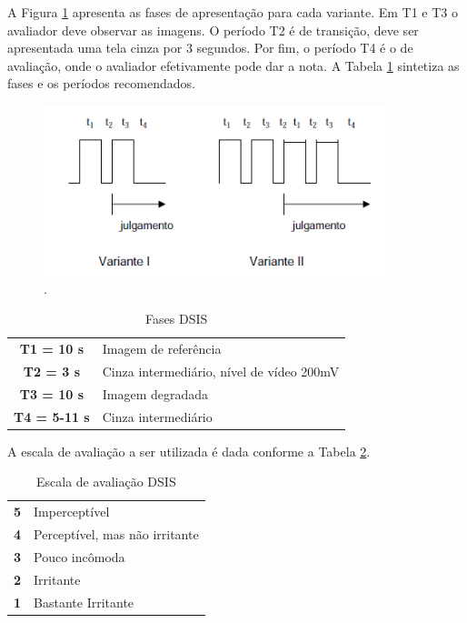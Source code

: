 A Figura \ref{fig:dsisvariantes} apresenta as fases de apresentação para cada variante. Em T1 e T3 o avaliador deve observar as imagens. O período T2 é de transição, deve ser apresentada uma tela cinza por 3 segundos. Por fim, o período T4 é o de avaliação, onde o avaliador efetivamente pode dar a nota. A Tabela \ref{tab:dsisfases} sintetiza as fases e os períodos recomendados.

\begin{figure}[!htb]
	\centering
	\includegraphics[width=0.9\textwidth]{./imgs/dsisvariantes.png}
	\caption{.}
	\label{fig:dsisvariantes}
\end{figure}

\begin{table}
	\centering
	\caption{Fases DSIS}
	\label{tab:dsisfases}
	\begin{tabular}{c|l}
		\hline
		\textbf{T1 = 10 s} & Imagem de referência \\
		\textbf{T2 = 3 s} & Cinza intermediário, nível de vídeo 200mV \\
		\textbf{T3 = 10 s} & Imagem degradada \\
		\textbf{T4 = 5-11 s} & Cinza intermediário \\
		\hline
	\end{tabular}
\end{table}

A escala de avaliação a ser utilizada é dada conforme a Tabela \ref{tab:dsisescala}.

\begin{table}
	\centering
	\caption{Escala de avaliação DSIS}
	\label{tab:dsisescala}
	\begin{tabular}{c|l}
		\hline
		\textbf{5} & Imperceptível \\
		\textbf{4} & Perceptível, mas não irritante \\
		\textbf{3} & Pouco incômoda \\
		\textbf{2} & Irritante \\
		\textbf{1} & Bastante Irritante \\
		\hline
	\end{tabular}
\end{table}


